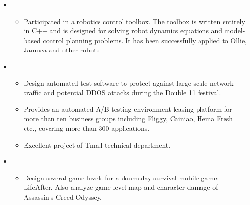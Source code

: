 \begin{itemize}[leftmargin=*]
  \item
        {\small
          \begin{itemize}
            \item Participated in a robotics control toolbox. The toolbox is written entirely in C++ and is designed for solving robot dynamics equations and model-based control planning problems. It has been successfully applied to Ollie, Jamoca and other robots.
          \end{itemize}
        }
  \item
        {\small
          \begin{itemize}
            \item Design automated test software to protect against large-scale network traffic and potential DDOS attacks during the Double 11 festival.
            \item Provides an automated A/B testing environment leasing platform for more than ten business groups including Fliggy, Cainiao, Hema Fresh etc., covering more than 300 applications.
            \item Excellent project of Tmall technical department.
          \end{itemize}
        }
  \item
        {\small
          \begin{itemize}
            \item Design several game levels for a doomsday survival mobile game: LifeAfter. Also analyze game level map and character damage of Assassin's Creed Odyssey.
          \end{itemize}
        }
\end{itemize}